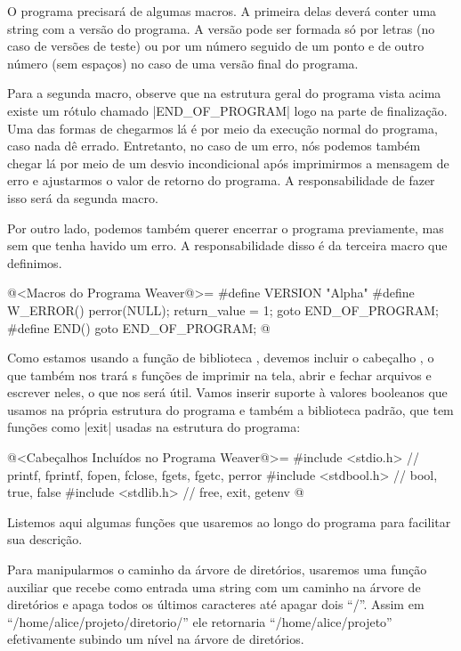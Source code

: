 
O programa precisará de algumas macros. A primeira delas deverá conter
uma string com a versão do programa. A versão pode ser formada só por
letras (no caso de versões de teste) ou por um número seguido de um
ponto e de outro número (sem espaços) no caso de uma versão final do
programa.

Para a segunda macro, observe que na estrutura geral do programa vista
acima existe um rótulo chamado |END_OF_PROGRAM| logo na parte de
finalização. Uma das formas de chegarmos lá é por meio da execução
normal do programa, caso nada dê errado. Entretanto, no caso de um
erro, nós podemos também chegar lá por meio de um desvio incondicional
após imprimirmos a mensagem de erro e ajustarmos o valor de retorno do
programa. A responsabilidade de fazer isso será da segunda macro.

Por outro lado, podemos também querer encerrar o programa previamente,
mas sem que tenha havido um erro. A responsabilidade disso é da
terceira macro que definimos.

\iniciocodigo
@<Macros do Programa Weaver@>=
#define VERSION "Alpha"
#define W_ERROR() {perror(NULL); return_value = 1; goto END_OF_PROGRAM;}
#define END() goto END_OF_PROGRAM;
@
\fimcodigo

Como estamos usando a função de biblioteca ,
devemos incluir o cabeçalho , o que também nos
trará s funções de imprimir na tela, abrir e fechar arquivos e
escrever neles, o que nos será útil. Vamos inserir suporte à valores
booleanos que usamos na própria estrutura do programa e também a
biblioteca padrão, que tem funções como |exit| usadas na estrutura do
programa:

\iniciocodigo
@<Cabeçalhos Incluídos no Programa Weaver@>=
#include <stdio.h> // printf, fprintf, fopen, fclose, fgets, fgetc, perror
#include <stdbool.h> // bool, true, false
#include <stdlib.h> // free, exit, getenv
@
\fimcodigo


Listemos aqui algumas funções que usaremos ao longo do programa para
facilitar sua descrição.


Para manipularmos o caminho da árvore de diretórios, usaremos uma
função auxiliar que recebe como entrada uma string com um caminho na
árvore de diretórios e apaga todos os últimos caracteres até apagar
dois ``/''. Assim em ``/home/alice/projeto/diretorio/'' ele retornaria
``/home/alice/projeto'' efetivamente subindo um nível na árvore de
diretórios.

